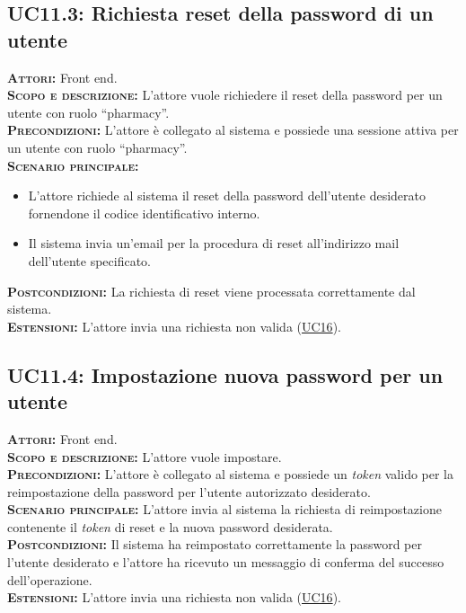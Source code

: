 \subsection{UC11.3: Richiesta reset della password di un utente}
\label{sec:UC113}
\textsc{\textbf{Attori:}} Front end.\\
\textsc{\textbf{Scopo e descrizione:}} L'attore vuole richiedere il reset della password per un utente con ruolo ``pharmacy''.\\
\textsc{\textsc{\textbf{Precondizioni:}}} L'attore è collegato al sistema e possiede una sessione attiva per un utente con ruolo ``pharmacy''.\\
\textsc{\textbf{Scenario principale:}} 
\begin{itemize}
    \item L'attore richiede al sistema il reset della password dell'utente desiderato fornendone il codice identificativo interno.
    \item Il sistema invia un'email per la procedura di reset all'indirizzo mail dell'utente specificato.
\end{itemize}
\textsc{\textbf{Postcondizioni:}} La richiesta di reset viene processata correttamente dal sistema.\\
\textsc{\textbf{Estensioni:}} L'attore invia una richiesta non valida (\hyperref[sec:UC16]{UC16}).

\subsection{UC11.4: Impostazione nuova password per un utente}
\label{sec:UC114}
\textsc{\textbf{Attori:}} Front end.\\
\textsc{\textbf{Scopo e descrizione:}} L'attore vuole impostare.\\
\textsc{\textsc{\textbf{Precondizioni:}}} L'attore è collegato al sistema e possiede un \textit{token} valido per la reimpostazione della password per l'utente autorizzato desiderato.\\
\textsc{\textbf{Scenario principale:}} L'attore invia al sistema la richiesta di reimpostazione contenente il \textit{token} di reset e la nuova password desiderata.\\
\textsc{\textbf{Postcondizioni:}} Il sistema ha reimpostato correttamente la password per l'utente desiderato e l'attore ha ricevuto un messaggio di conferma del successo dell'operazione.\\
\textsc{\textbf{Estensioni:}} L'attore invia una richiesta non valida (\hyperref[sec:UC16]{UC16}).

